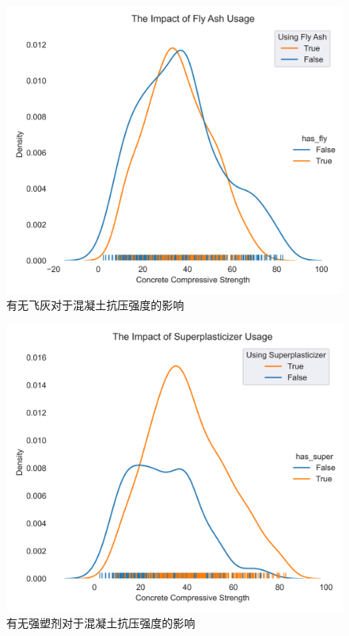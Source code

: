 \begin{figure}[!htbp]
    \centering
    \includegraphics[scale=1]{images/has_fly.png}
    \caption{有无飞灰对于混凝土抗压强度的影响}\label{hasFly}
\end{figure}

\begin{figure}[!htbp]
    \centering
    \includegraphics[scale=1]{images/has_super.png}
    \caption{有无强塑剂对于混凝土抗压强度的影响}\label{hasSuper}
\end{figure}



